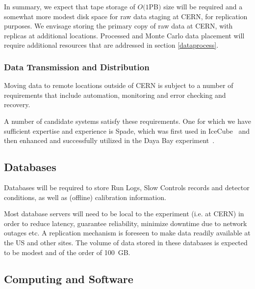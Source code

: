 In summary, we expect that tape storage of $O(1 $PB$)$ size will be required and a somewhat more modest disk space for raw data staging at CERN, for replication purposes.  We envisage storing the primary copy of raw data at CERN, with replicas at additional locations. 
%
Processed and Monte Carlo data placement will require additional resources that are addressed in section \ref{dataprocess}.


\subsubsection{Data Transmission and Distribution}
Moving data to remote locations outside of CERN is subject to a number of requirements that include
automation, monitoring and error checking and recovery. 

A number of candidate systems satisfy these requirements. One for which we have sufficient expertise and experience is Spade, which was first used in IceCube~\cite{spade_icecube} and then enhanced and successfully utilized in the Daya Bay experiment~\cite{spade_dayabay}.


\subsection{Databases}
Databases will be required to store Run Logs, Slow Controls records and detector conditions, as well as (offline) calibration information.

Most database servers will need to be local to the experiment (i.e. at CERN) in order to reduce latency, guarantee reliability, minimize
downtime due to network outages etc. A replication mechanism is foreseen to make data readily available at the US and other sites.
The volume of data stored in these databases is expected to be modest and of the order of 100~GB.


\subsection{Computing and Software}


